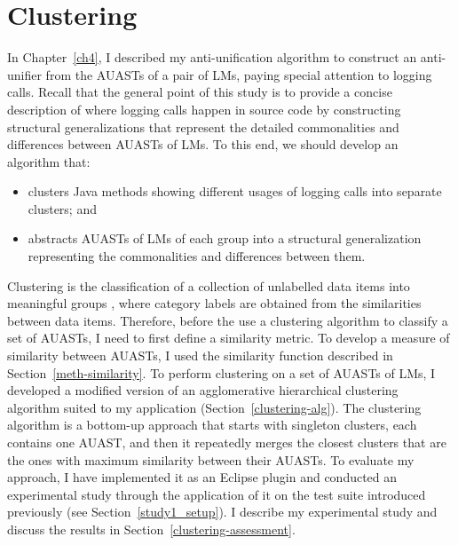 \chapter{Clustering}  \label{clustering}
In Chapter~\ref{ch4}, I described my anti-unification algorithm to construct an anti-unifier from the AUASTs of a pair of LMs, paying special attention to logging calls. Recall that the general point of this study is to provide a concise description of where logging calls happen in source code by constructing structural generalizations that represent the detailed commonalities and differences between AUASTs of LMs. To this end, we should develop an algorithm that:
\begin{itemize} [leftmargin=.5in]
\item clusters Java methods showing different usages of logging calls into separate clusters; and

\item abstracts AUASTs of LMs of each group into a structural generalization representing the commonalities and differences between them.
\end{itemize}

Clustering is the classification of a collection of unlabelled data items into meaningful groups \cite{jain1999data} , where category labels are obtained from the similarities between data items. Therefore, before the use a clustering algorithm to classify a set of AUASTs, I need to first define a similarity metric. To develop a measure of similarity between AUASTs, I used the similarity function described in Section~\ref{meth-similarity}. To perform clustering on a set of AUASTs of LMs, I developed a modified version of an agglomerative hierarchical clustering algorithm suited to my application (Section~\ref{clustering-alg}). The clustering algorithm is a bottom-up approach that starts with singleton clusters, each contains one AUAST, and then it repeatedly merges the closest clusters that are the ones with maximum similarity between their AUASTs. To evaluate my approach, I have implemented it as an Eclipse plugin  %
and conducted an experimental study through the application of it on the test suite introduced previously (see Section~\ref{study1_setup}). I describe my experimental study and discuss the results in Section~\ref{clustering-assessment}.



